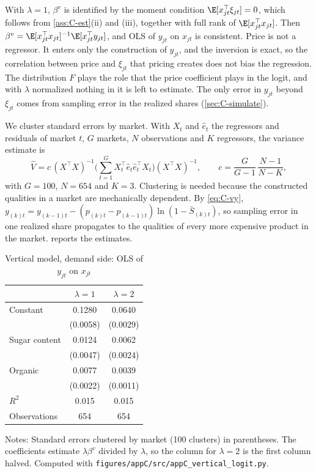 With $\lambda = 1$, $\beta^v$ is identified by the moment condition $\E[x_{jt}^\top\xi_{jt}] = 0$, which follows from
\cref{ass:C-est}(ii) and (iii), together with full rank of $\E[x_{jt}^\top x_{jt}]$. Then
$\beta^v = \E[x_{jt}^\top x_{jt}]^{-1}\E[x_{jt}^\top y_{jt}]$, and OLS of $y_{jt}$ on $x_{jt}$ is consistent. Price is
not a regressor. It enters only the construction of $y_{jt}$, and the inversion is exact, so the correlation between
price and $\xi_{jt}$ that pricing creates does not bias the regression. The distribution $F$ plays the role that the
price coefficient plays in the logit, and with $\lambda$ normalized nothing in it is left to estimate. The only error
in $y_{jt}$ beyond $\xi_{jt}$ comes from sampling error in the realized shares (\cref{sec:C-simulate}).

We cluster standard errors by market. With $X_t$ and $\hat e_t$ the regressors and residuals of market $t$, $G$
markets, $N$ observations and $K$ regressors, the variance estimate is
\begin{equation}\label{eq:C-clustervar}
  \hat V = c\,(X^\top X)^{-1}\Big(\sum_{t=1}^{G}X_t^\top\hat e_t\hat e_t^\top X_t\Big)(X^\top X)^{-1},
  \qquad c = \frac{G}{G - 1}\,\frac{N - 1}{N - K},
\end{equation}
with $G = 100$, $N = 654$ and $K = 3$. Clustering is needed because the constructed qualities in a market are
mechanically dependent. By \eqref{eq:C-vy}, $y_{(k)t} = y_{(k-1)t} - (p_{(k)t} - p_{(k-1)t})\ln(1 - \bar S_{(k)t})$, so
sampling error in one realized share propagates to the qualities of every more expensive product in the market.
 reports the estimates.

\begin{table}[htbp]
\centering
\caption{Vertical model, demand side: OLS of $y_{jt}$ on $x_{jt}$}
\label{tab:C-vdemand}
\small
\begin{tabular}{@{}lcc@{}}
\toprule
 & $\lambda = 1$ & $\lambda = 2$ \\
\midrule
Constant & 0.1280 & 0.0640 \\
 & (0.0058) & (0.0029) \\
Sugar content & 0.0124 & 0.0062 \\
 & (0.0047) & (0.0024) \\
Organic & 0.0077 & 0.0039 \\
 & (0.0022) & (0.0011) \\
\midrule
$R^2$ & 0.015 & 0.015 \\
Observations & 654 & 654 \\
\bottomrule
\end{tabular}

\vspace{3pt}
\begin{minipage}{0.97\textwidth}
\footnotesize Notes: Standard errors clustered by market (100 clusters) in parentheses. The
coefficients estimate $\lambda\beta^v$ divided by $\lambda$, so the column for $\lambda = 2$ is the first column halved.
Computed with \texttt{figures/appC/src/appC\_vertical\_logit.py}.
\end{minipage}
\end{table}

